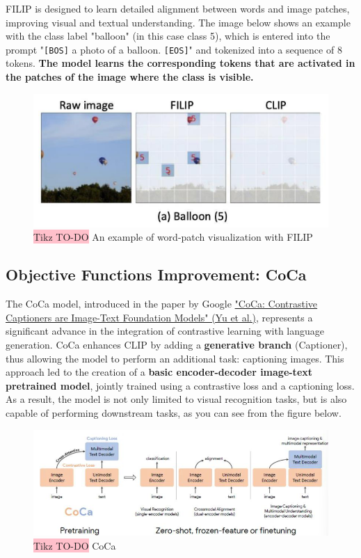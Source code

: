 FILIP is designed to learn detailed alignment between words and image patches, improving visual and textual understanding. The image below shows an example with the class label "balloon" (in this case class 5), which is entered into the prompt "\texttt{[BOS]} a photo of a balloon. \texttt{[EOS]}" and tokenized into a sequence of 8 tokens. \textbf{The model learns the corresponding tokens that are activated in the patches of the image where the class is visible.} 

\begin{figure}[!htbp]
    \centering
    \includegraphics[width=0.8\linewidth]{tikz/chapter11 - FILIP vs CLIP.png}
    \caption{{\color{red}\colorbox{pink}{Tikz TO-DO}} An example of word-patch visualization with FILIP}
\end{figure}


\subsection{Objective Functions Improvement: CoCa}

The CoCa model, introduced in the paper by Google \href{https://arxiv.org/pdf/2205.01917}{"CoCa: Contrastive Captioners are Image-Text Foundation Models" (Yu et al.)}, represents a significant advance in the integration of contrastive learning with language generation. CoCa enhances CLIP by adding a \textbf{generative branch} (Captioner), thus allowing the model to perform an additional task: captioning images. This approach led to the creation of a \textbf{basic encoder-decoder image-text pretrained model}, jointly trained using a contrastive loss and a captioning loss. As a result, the model is not only limited to visual recognition tasks, but is also capable of performing downstream tasks, as you can see from the figure below.

\begin{figure}[!htbp]
    \centering
    \includegraphics[width=\linewidth]{tikz/chapter11 - CoCa.png}
    \caption{{\color{red}\colorbox{pink}{Tikz TO-DO}} CoCa}
\end{figure}


